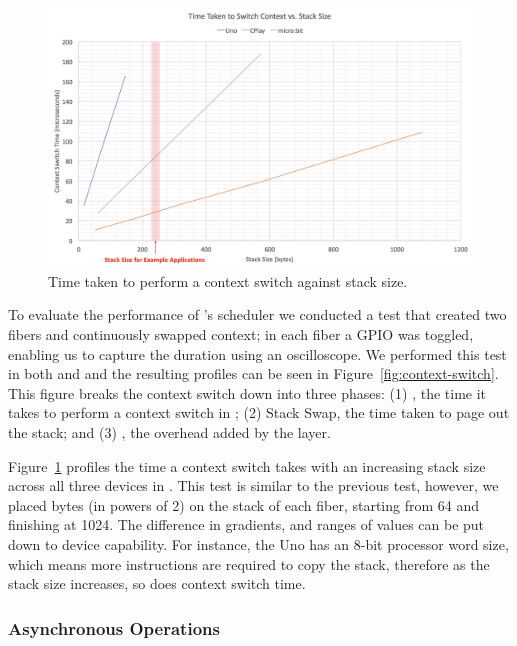 \begin{figure}[ht]
    \includegraphics[width=.9\columnwidth]{images/context-vs-stack.png}
\caption{\label{fig:context-vs-stack}Time taken to perform a context switch against stack size.}
\end{figure}

To evaluate the performance of \CON's scheduler we conducted a test that created two fibers and continuously swapped context; in each fiber a GPIO was toggled, enabling us to capture the duration using an oscilloscope. We performed this test in both \MC and \CO and the resulting profiles can be seen in Figure~\ref{fig:context-switch}. This figure breaks the context switch down into three phases: (1) \CO, the time it takes to perform a context switch in \CO; (2) Stack Swap, the time taken to page out the \MC stack; and (3) \MC, the overhead added by the \MC layer.

Figure~\ref{fig:context-vs-stack} profiles the time a context switch takes with an increasing stack size across all three devices in \CO. This test is similar to the previous test, however, we placed bytes (in powers of 2) on the stack of each fiber, starting from 64 and finishing at 1024. The difference in gradients, and ranges of values can be put down to device capability. For instance, the Uno has an 8-bit processor word size, which means more instructions are required to copy the stack, therefore as the stack size increases, so does context switch time.

\subsubsection{Asynchronous Operations}

